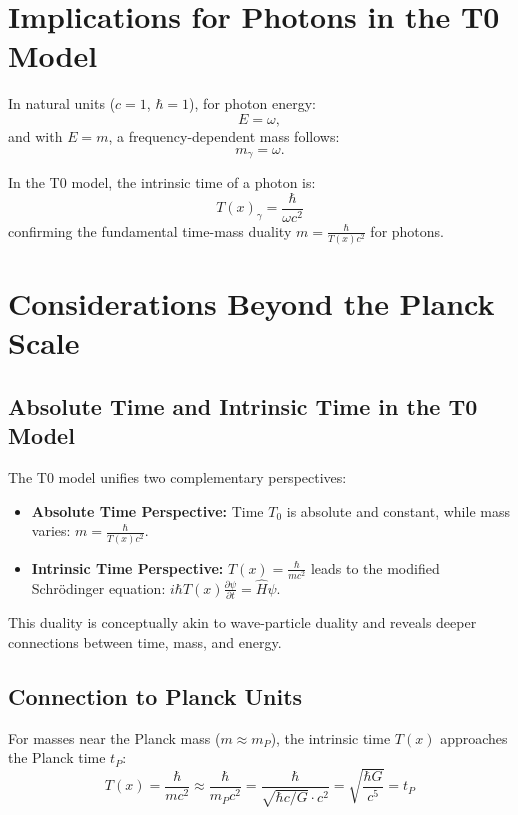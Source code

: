 \documentclass[12pt,a4paper]{article}
\newcommand{\Tfield}{T(x)}
\newcommand{\Tzero}{T_0}
\begin{document}
	\section{Implications for Photons in the T0 Model}
	
	In natural units (\(c = 1\), \(\hbar = 1\)), for photon energy:
	\begin{equation}
		E = \omega,
	\end{equation}
	and with \(E = m\), a frequency-dependent mass follows:
	\begin{equation}
		m_{\gamma} = \omega.
	\end{equation}
	
	In the T0 model, the intrinsic time of a photon is:
	\begin{equation}
		\Tfield_{\gamma} = \frac{\hbar}{\omega c^2}
	\end{equation}
	confirming the fundamental time-mass duality \(m = \frac{\hbar}{\Tfield c^2}\) for photons.
	
	\section{Considerations Beyond the Planck Scale}
	
	\subsection{Absolute Time and Intrinsic Time in the T0 Model}
	
	The T0 model unifies two complementary perspectives:
	\begin{itemize}
		\item \textbf{Absolute Time Perspective:} Time \(\Tzero\) is absolute and constant, while mass varies: \(m = \frac{\hbar}{\Tfield c^2}\).
		\item \textbf{Intrinsic Time Perspective:} \(\Tfield = \frac{\hbar}{m c^2}\) leads to the modified Schrödinger equation: \(i\hbar \Tfield \frac{\partial \psi}{\partial t} = \hat{H} \psi\).
	\end{itemize}
	
	This duality is conceptually akin to wave-particle duality and reveals deeper connections between time, mass, and energy.
	
	\subsection{Connection to Planck Units}
	
	For masses near the Planck mass (\(m \approx m_P\)), the intrinsic time \(\Tfield\) approaches the Planck time \(t_P\):
	\begin{equation}
		\Tfield = \frac{\hbar}{m c^2} \approx \frac{\hbar}{m_P c^2} = \frac{\hbar}{\sqrt{\hbar c/G} \cdot c^2} = \sqrt{\frac{\hbar G}{c^5}} = t_P
	\end{equation}
	
\end{document}
